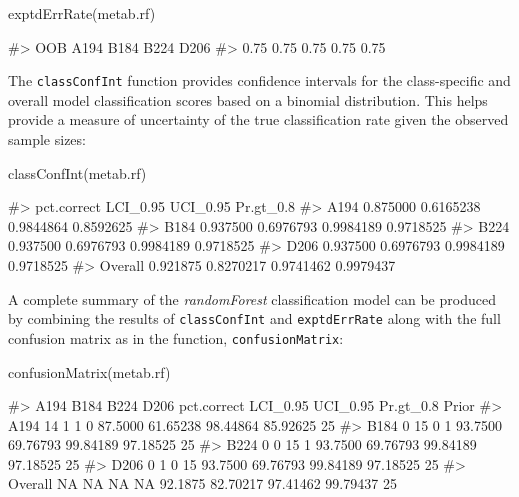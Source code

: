 \begin{Schunk}
\begin{Sinput}
exptdErrRate(metab.rf)
\end{Sinput}
\begin{Soutput}
#>  OOB A194 B184 B224 D206 
#> 0.75 0.75 0.75 0.75 0.75
\end{Soutput}
\end{Schunk}

The \texttt{classConfInt} function provides confidence intervals for the
class-specific and overall model classification scores based on a
binomial distribution. This helps provide a measure of uncertainty of
the true classification rate given the observed sample sizes:

\begin{Schunk}
\begin{Sinput}
classConfInt(metab.rf)
\end{Sinput}
\begin{Soutput}
#>         pct.correct  LCI_0.95  UCI_0.95 Pr.gt_0.8
#> A194       0.875000 0.6165238 0.9844864 0.8592625
#> B184       0.937500 0.6976793 0.9984189 0.9718525
#> B224       0.937500 0.6976793 0.9984189 0.9718525
#> D206       0.937500 0.6976793 0.9984189 0.9718525
#> Overall    0.921875 0.8270217 0.9741462 0.9979437
\end{Soutput}
\end{Schunk}

A complete summary of the \emph{randomForest} classification model can
be produced by combining the results of \texttt{classConfInt} and
\texttt{exptdErrRate} along with the full confusion matrix as in the
function, \texttt{confusionMatrix}:

\begin{Schunk}
\begin{Sinput}
confusionMatrix(metab.rf)
\end{Sinput}
\begin{Soutput}
#>         A194 B184 B224 D206 pct.correct LCI_0.95 UCI_0.95 Pr.gt_0.8 Prior
#> A194      14    1    1    0     87.5000 61.65238 98.44864  85.92625    25
#> B184       0   15    0    1     93.7500 69.76793 99.84189  97.18525    25
#> B224       0    0   15    1     93.7500 69.76793 99.84189  97.18525    25
#> D206       0    1    0   15     93.7500 69.76793 99.84189  97.18525    25
#> Overall   NA   NA   NA   NA     92.1875 82.70217 97.41462  99.79437    25
\end{Soutput}
\end{Schunk}

